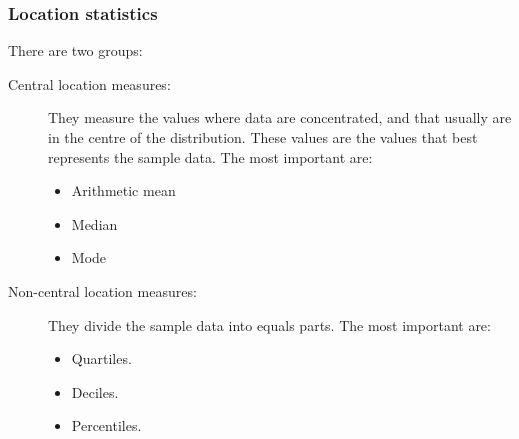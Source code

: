 \begin{frame}
\frametitle{Location statistics}
There are two groups: 


\begin{description}
\item [Central location measures:] They measure the values where data are concentrated, and that usually are in the
centre of the distribution. 
These values are the values that best represents the sample data. 
The most important are:
\begin{itemize}
\item Arithmetic mean
\item Median
\item Mode
\end{itemize}
\item [Non-central location measures:] They divide the sample data into equals parts. 
The most important are:
\begin{itemize}
\item Quartiles.
\item Deciles.
\item Percentiles. 
\end{itemize}
\end{description}
\end{frame}
% 
% 
% 
% 
